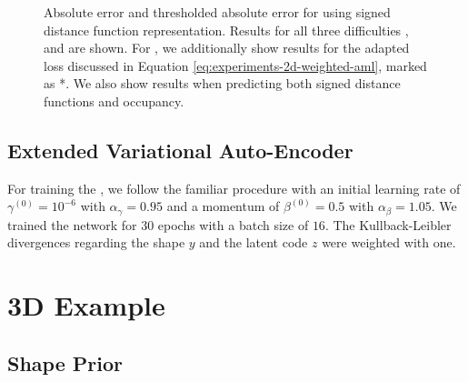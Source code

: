\begin{figure}
  \caption{Absolute error \Abs and thresholded absolute error \AbsThr
  for \AML using signed distance function representation. 
  Results for all three difficulties \easy, \moderate and \hard
  are shown. For \hard, we additionally show results for the adapted
  loss discussed in Equation \eqref{eq:experiments-2d-weighted-aml}, marked as *.
  We also show results when predicting both signed distance functions
  and occupancy.}
  \label{fig:experiments-2d-sdf-aml}
\end{figure}

\subsection{Extended Variational Auto-Encoder}

For training the \EVAE, we follow the familiar procedure with an initial 
learning rate of $\gamma^{(0)} = 10^{-6}$ with $\alpha_{\gamma} = 0.95$ and
a momentum of $\beta^{(0)} = 0.5$ with $\alpha_{\beta} = 1.05$. We trained the
network for $30$ epochs with a batch size of $16$. The Kullback-Leibler divergences
regarding the shape $y$ and the latent code $z$ were weighted with one.

\section{3D Example}
\label{sec:appendix-experiments-3d}

\subsection{Shape Prior}

